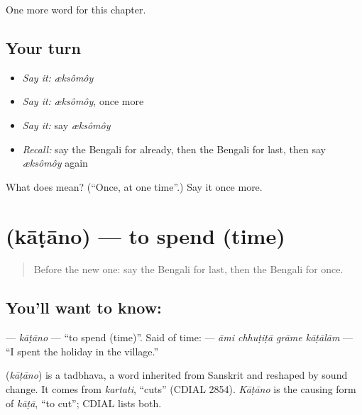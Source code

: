 \begin{grammarlens}[title={What you've built}]
One more word for this chapter.
\end{grammarlens}

\subsection*{Your turn}
\begin{itemize}
\raggedright
  \item \emph{Say it:} \emph{æksômôy}
  \item \emph{Say it:} \emph{æksômôy}, once more
  \item \emph{Say it:} say \emph{æksômôy}
  \item \emph{Recall:} say the Bengali for already, then the Bengali for last, then say \emph{æksômôy} again
\end{itemize}

\begin{tcolorbox}[breakable,colback=teal!4,colframe=teal!35!black,title={Before you move on}]
What does  mean? (\textquotedblleft{}Once, at one time\textquotedblright{}.) Say it once more.
\end{tcolorbox}
\section[\texorpdfstring{\bn{কাটানো} (kāṭāno)}{কাটানো (kāṭāno)}]{ (kāṭāno) — to spend (time)}

\label{lesson:BN-C145-katano}



\begin{quote}
Before the new one: say the Bengali for last, then the Bengali for once.
\end{quote}

\subsection*{You'll want to know: }
\textbf{} — \emph{kāṭāno} — \textquotedblleft{}to spend (time)\textquotedblright{}. Said of time: \textbf{   } — \emph{āmi chhuṭiṭā grāme kāṭālām} — \textquotedblleft{}I spent the holiday in the village.\textquotedblright{}

\begin{cousinweb}
\textbf{} (\emph{kāṭāno}) is a tadbhava, a word inherited from Sanskrit and reshaped by sound change. It comes from \emph{kartati}, \textquotedblleft{}cuts\textquotedblright{} (CDIAL 2854). \emph{Kāṭāno} is the causing form of \emph{kāṭā}, \textquotedblleft{}to cut\textquotedblright{}; CDIAL lists both.
\end{cousinweb}

